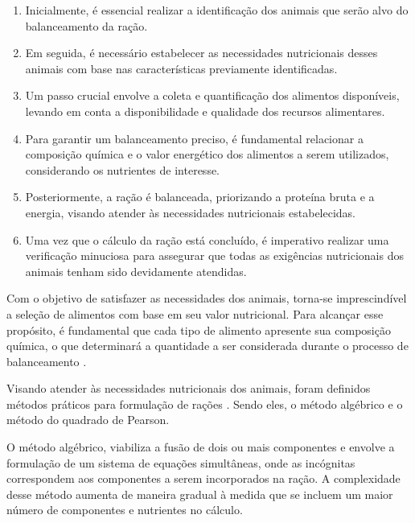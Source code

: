 \begin{enumerate}
  \item Inicialmente, é essencial realizar a identificação dos animais que serão alvo do balanceamento da ração.

  \item Em seguida, é necessário estabelecer as necessidades nutricionais desses animais com base nas características previamente identificadas.

  \item Um passo crucial envolve a coleta e quantificação dos alimentos disponíveis, levando em conta a disponibilidade e qualidade dos recursos alimentares.

  \item Para garantir um balanceamento preciso, é fundamental relacionar a composição química e o valor energético dos alimentos a serem utilizados, considerando os nutrientes de interesse.

  \item Posteriormente, a ração é balanceada, priorizando a proteína bruta e a energia, visando atender às necessidades nutricionais estabelecidas.

  \item Uma vez que o cálculo da ração está concluído, é imperativo realizar uma verificação minuciosa para assegurar que todas as exigências nutricionais dos animais tenham sido devidamente atendidas.
\end{enumerate}

Com o objetivo de satisfazer as necessidades dos animais, torna-se imprescindível a seleção de alimentos com base em seu valor nutricional. Para alcançar esse propósito, é fundamental que cada tipo de alimento apresente sua composição química, o que determinará a quantidade a ser considerada durante o processo de balanceamento \cite{Tomich:2015:NutricaoPrecisaoPecuariaLeiteira}.

Visando atender às necessidades nutricionais dos animais, foram definidos métodos práticos para formulação de rações \cite{Salman2020:ManualFormulacaoRacaoVacasLeiteiras}. Sendo eles, o método algébrico e o método do quadrado de Pearson.

O método algébrico, viabiliza a fusão de dois ou mais componentes e envolve a formulação de um sistema de equações simultâneas, onde as incógnitas correspondem aos componentes a serem incorporados na ração. A complexidade desse método aumenta de maneira gradual à medida que se incluem um maior número de componentes e nutrientes no cálculo.


